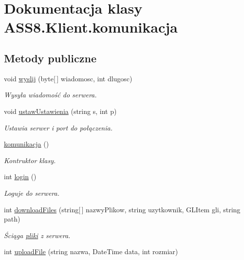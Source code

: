 \hypertarget{a00013}{
\section{Dokumentacja klasy ASS8.Klient.komunikacja}
\label{d7/dd4/a00013}
}
\subsection*{Metody publiczne}
\begin{CompactItemize}
\item 
void \hyperlink{a00013_5069ee8ced0e023865e277f07ba690a9}{wyslij} (byte\mbox{[}$\,$\mbox{]} wiadomosc, int dlugosc)
\begin{CompactList}\small\item\em Wysyła wiadomość do serwera. \item\end{CompactList}\item 
void \hyperlink{a00013_da808f405d71a8f5f06659bac3b3fe50}{ustawUstawienia} (string s, int p)
\begin{CompactList}\small\item\em Ustawia serwer i port do połączenia. \item\end{CompactList}\item 
\hyperlink{a00013_178f432b69d8d6f2c1d6b8f6d1c43eb9}{komunikacja} ()
\begin{CompactList}\small\item\em Kontruktor klasy. \item\end{CompactList}\item 
int \hyperlink{a00013_cdc8379f1139bc25fb24a6c9b6ce1cc1}{login} ()
\begin{CompactList}\small\item\em Loguje do serwera. \item\end{CompactList}\item 
int \hyperlink{a00013_d93f81514442cd3a5eeea0db9b1c9148}{downloadFiles} (string\mbox{[}$\,$\mbox{]} nazwyPlikow, string uzytkownik, GLItem gli, string path)
\begin{CompactList}\small\item\em Ściąga \hyperlink{a00017}{pliki} z serwera. \item\end{CompactList}\item 
int \hyperlink{a00013_9449630c9b6bbf88144aba3981d8eb72}{uploadFile} (string nazwa, DateTime data, int rozmiar)

\end{CompactItemize}
